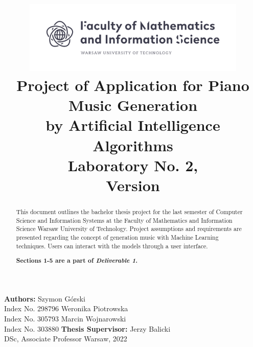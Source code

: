 \documentclass{article}
\title{\includegraphics[width=0.8\textwidth]{MINI.png} \\ Project of Application for Piano Music Generation \\ by Artificial Intelligence Algorithms \\ [0.35em]\large Laboratory No. 2, \\ Version \currentversion }
\author{}
\date{}
\begin{document}
\maketitle
\begin{center}
    \normalsize\textbf{Authors:}
    \vskip10pt
    \Large{Szymon Górski} \\
    \large{Index No. 298796}
    \vskip10pt
    \Large{Weronika Piotrowska} \\
    \large{Index No. 305793}
    \vskip10pt
    \Large{Marcin Wojnarowski} \\
    \large{Index No. 303880}
    \vskip50pt
    \normalsize\textbf{Thesis Supervisor:}
    \vskip10pt
    \Large{Jerzy Balicki} \\
    \large{DSc, Associate Professor}
    \vfill
    \large{Warsaw, 2022}
\end{center}

\newpage
\begin{abstract}
    This document outlines the bachelor thesis project for the last semester of Computer Science and Information Systems at the Faculty of Mathematics and Information Science Warsaw University of Technology. Project assumptions and requirements are presented regarding the concept of generation music with Machine Learning techniques. Users can interact with the models through a user interface.

    \hfill


    \textbf{Sections 1-5 are a part of \textit{Deliverable 1}.}
\end{abstract}

\vskip50pt
\end{document}
